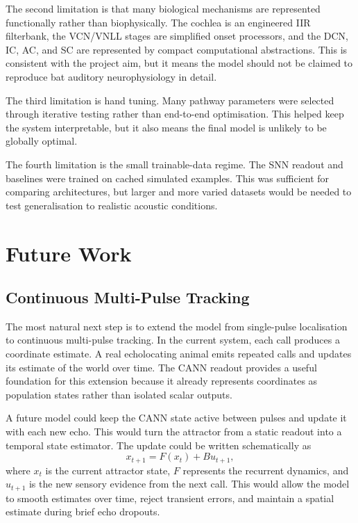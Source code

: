 The second limitation is that many biological mechanisms are represented functionally rather than biophysically. The cochlea is an engineered IIR filterbank, the VCN/VNLL stages are simplified onset processors, and the DCN, IC, AC, and SC are represented by compact computational abstractions. This is consistent with the project aim, but it means the model should not be claimed to reproduce bat auditory neurophysiology in detail.

The third limitation is hand tuning. Many pathway parameters were selected through iterative testing rather than end-to-end optimisation. This helped keep the system interpretable, but it also means the final model is unlikely to be globally optimal.

The fourth limitation is the small trainable-data regime. The SNN readout and baselines were trained on cached simulated examples. This was sufficient for comparing architectures, but larger and more varied datasets would be needed to test generalisation to realistic acoustic conditions.

\section{Future Work}

\subsection{Continuous Multi-Pulse Tracking}

The most natural next step is to extend the model from single-pulse localisation to continuous multi-pulse tracking. In the current system, each call produces a coordinate estimate. A real echolocating animal emits repeated calls and updates its estimate of the world over time. The CANN readout provides a useful foundation for this extension because it already represents coordinates as population states rather than isolated scalar outputs.

A future model could keep the CANN state active between pulses and update it with each new echo. This would turn the attractor from a static readout into a temporal state estimator. The update could be written schematically as
\begin{equation}
    x_{t+1}
    =
    F(x_t) + B u_{t+1},
\end{equation}
where $x_t$ is the current attractor state, $F$ represents the recurrent dynamics, and $u_{t+1}$ is the new sensory evidence from the next call. This would allow the model to smooth estimates over time, reject transient errors, and maintain a spatial estimate during brief echo dropouts.

